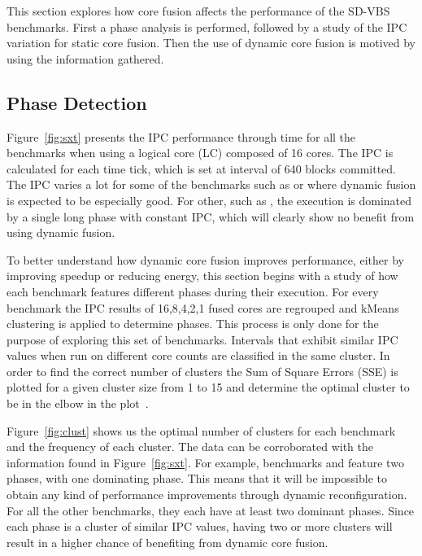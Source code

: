 This section explores how core fusion affects the performance of the SD-VBS benchmarks.
First a phase analysis is performed, followed by a study of the IPC variation for static core fusion.
Then the use of dynamic core fusion is motived by using the information gathered.

\subsection{Phase Detection}
Figure~\ref{fig:sxt} presents the IPC performance through time for all the benchmarks when using a logical core (LC) composed of 16 cores.
The IPC is calculated for each time tick, which is set at interval of 640 blocks committed.
The IPC varies a lot for some of the benchmarks such as  or  where dynamic fusion is expected to be especially good.
For other, such as , the execution is dominated by a single long phase with constant IPC, which will clearly show no benefit from using dynamic fusion.

To better understand how dynamic core fusion improves performance, either by improving speedup or reducing energy, this section begins with a study of how each benchmark features different phases during their execution.
For every benchmark the IPC results of 16,8,4,2,1 fused cores are regrouped and kMeans clustering is applied to determine phases.
This process is only done for the purpose of exploring this set of benchmarks.
Intervals that exhibit similar IPC values when run on different core counts are classified in the same cluster.
In order to find the correct number of clusters the Sum of Square Errors (SSE) is plotted for a given cluster size from 1 to 15 and determine the optimal cluster to be in the elbow in the plot~\cite{everitCluster2001}.

\vspace{5mm}
Figure~\ref{fig:clust} shows us the optimal number of clusters for each benchmark and the frequency of each cluster.
The data can be corroborated with the information found in Figure~\ref{fig:sxt}.
For example, benchmarks  and  feature two phases, with one dominating phase.
This means that it will be impossible to obtain any kind of performance improvements through dynamic reconfiguration.
For all the other benchmarks, they each have at least two dominant phases.
Since each phase is a cluster of similar IPC values, having two or more clusters will result in a higher chance of benefiting from dynamic core fusion.


